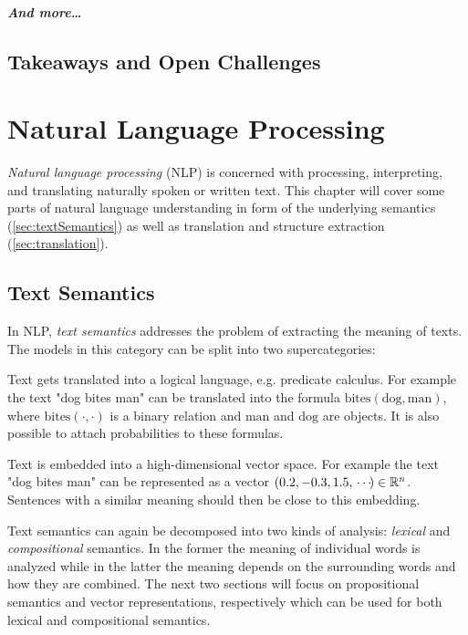		\paragraph{And more\dots} %

	\section{Takeaways and Open Challenges} %

\chapter{Natural Language Processing}
	\emph{Natural language processing} (NLP) is concerned with processing, interpreting, and translating naturally spoken or written text. This chapter will cover some parts of natural language understanding in form of the underlying semantics (\autoref{sec:textSemantics}) as well as translation and structure extraction (\autoref{sec:translation}).

	\section{Text Semantics}
		\label{sec:textSemantics}

		In NLP, \emph{text semantics} addresses the problem of extracting the meaning of texts. The models in this category can be split into two supercategories:
		\begin{description}[leftmargin = 5cm]
			\item[Propositional Semantics]
				Text gets translated into a logical language, e.g. predicate calculus. For example the text "dog bites man" can be translated into the formula \( \mathrm{bites}(\mathrm{dog}, \mathrm{man}) \), where \( \mathrm{bites}(\cdot, \cdot) \) is a binary relation and \(\mathrm{man}\) and \(\mathrm{dog}\) are objects. It is also possible to attach probabilities to these formulas.
			\item[Vector Representation]
				Text is embedded into a high-dimensional vector space. For example the text "dog bites man" can be represented as a vector \( (0.2, -0.3, 1.5, \,\cdots\!) \in \mathbb{R}^n \). Sentences with a similar meaning should then be close to this embedding.
		\end{description}
		Text semantics can again be decomposed into two kinds of analysis: \emph{lexical} and \emph{compositional} semantics. In the former the meaning of individual words is analyzed while in the latter the meaning depends on the surrounding words and how they are combined. The next two sections will focus on propositional semantics and vector representations, respectively which can be used for both lexical and compositional semantics.

